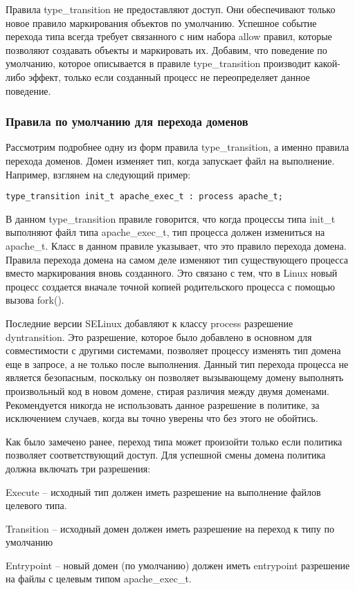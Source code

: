 \documentclass{./../class/UIR}
\begin{document}
    Правила type\_transition не предоставляют доступ. Они обеспечивают только
    новое правило маркирования объектов по умолчанию. Успешное событие перехода
    типа всегда требует связанного с ним набора allow правил, которые позволяют
    создавать объекты и маркировать их. Добавим, что поведение по умолчанию,
    которое описывается в правиле type\_transition производит какой-либо эффект,
    только если созданный процесс не переопределяет данное поведение.

\subsubsection{Правила по умолчанию для перехода доменов}

    Рассмотрим подробнее одну из форм правила type\_transition, а именно правила
    перехода доменов. Домен изменяет тип, когда запускает файл на выполнение.
    Например, взглянем на следующий пример:
\begin{verbatim}
type_transition init_t apache_exec_t : process apache_t;
\end{verbatim}
    В данном type\_transition правиле говорится, что когда процессы типа init\_t
    выполняют файл типа apache\_exec\_t, тип процесса должен измениться на
    apache\_t. Класс в данном правиле указывает, что это правило перехода
    домена. Правила перехода домена на самом деле изменяют тип существующего
    процесса вместо маркирования вновь созданного. Это связано с тем, что в
    Linux новый процесс создается вначале точной копией родительского процесса
    с помощью вызова fork().

    Последние версии SELinux добавляют к классу process разрешение
    dyntransition. Это разрешение, которое было добавлено в основном для
    совместимости с другими системами, позволяет процессу изменять тип домена
    еще в запросе, а не только после выполнения. Данный тип перехода процесса
    не является безопасным, поскольку он позволяет вызывающему домену выполнять
    произвольный код в новом домене, стирая различия между двумя доменами.
    Рекомендуется никогда не использовать данное разрешение в политике, за
    исключением случаев, когда вы точно уверены что без этого не обойтись.

    Как было замечено ранее, переход типа может произойти только если политика
    позволяет соответствующий доступ. Для успешной смены домена политика должна
    включать три разрешения:
    \begin{description}
      \item Execute – исходный тип должен иметь разрешение на выполнение файлов
      целевого типа.
      \item Transition – исходный домен должен иметь разрешение на переход к
       типу по умолчанию
      \item Entrypoint – новый домен (по умолчанию) должен иметь entrypoint
      разрешение на файлы с целевым типом apache\_exec\_t.
    \end{description}
\end{document}

